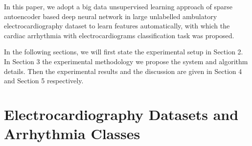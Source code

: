 \documentclass[journal]{IEEEtran}
\begin{document}
In this paper, we adopt a big data unsupervised learning approach of sparse autoencoder based deep neural network in large unlabelled ambulatory electrocardiography dataset to learn features automatically, with which the cardiac arrhythmia with electrocardiograms classification task was proposed. 

In the following sections, we will first state the experimental setup in Section 2. In Section 3 the experimental methodology we propose the system and algorithm details. Then the experimental results and the discussion are given in Section 4 and Section 5 respectively.

\section{Electrocardiography Datasets and Arrhythmia Classes}
\end{document}
